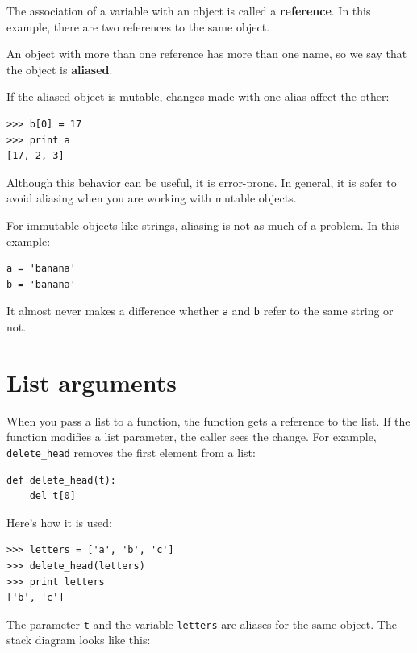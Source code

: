 \documentclass[10pt]{book}
\begin{document}
The association of a variable with an object is called a {\bf
reference}.  In this example, there are two references to the same
object.


An object with more than one reference has more
than one name, so we say that the object is {\bf aliased}.


If the aliased object is mutable, 
changes made with one alias affect
the other:

\beforeverb
\begin{verbatim}
>>> b[0] = 17
>>> print a
[17, 2, 3]
\end{verbatim}
\afterverb
%
Although this behavior can be useful, it is error-prone.  In general,
it is safer to avoid aliasing when you are working with mutable
objects.


For immutable objects like strings, aliasing is not as much of a
problem.  In this example:

\beforeverb
\begin{verbatim}
a = 'banana'
b = 'banana'
\end{verbatim}
\afterverb
%
It almost never makes a difference whether {\tt a} and {\tt b} refer
to the same string or not.


\section{List arguments}


When you pass a list to a function, the function gets a reference
to the list.
If the function modifies a list parameter, the caller sees the change.
For example, \verb"delete_head" removes the first element from a list:

\beforeverb
\begin{verbatim}
def delete_head(t):
    del t[0]
\end{verbatim}
\afterverb
%
Here's how it is used:

\beforeverb
\begin{verbatim}
>>> letters = ['a', 'b', 'c']
>>> delete_head(letters)
>>> print letters
['b', 'c']
\end{verbatim}
\afterverb
%
The parameter {\tt t} and the variable {\tt letters} are
aliases for the same object.  The stack diagram looks like
this:
\end{document}

